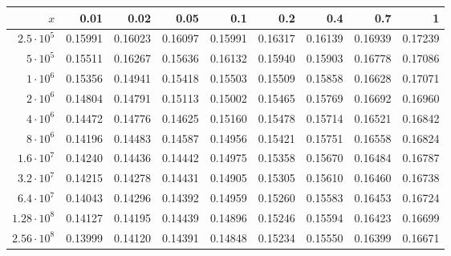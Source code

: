 \begin{tabular}{@{}rrrrrrrrr@{}}
\toprule
$x$ & 0.01 & 0.02 & 0.05 & 0.1 & 0.2 & 0.4 & 0.7 & 1 \\
\midrule
$2.5\cdot10^{5}$ & 0.15991 & 0.16023 & 0.16097 & 0.15991 & 0.16317 & 0.16139 & 0.16939 & 0.17239 \\
$5\cdot10^{5}$ & 0.15511 & 0.16267 & 0.15636 & 0.16132 & 0.15940 & 0.15903 & 0.16778 & 0.17086 \\
$1\cdot10^{6}$ & 0.15356 & 0.14941 & 0.15418 & 0.15503 & 0.15509 & 0.15858 & 0.16628 & 0.17071 \\
$2\cdot10^{6}$ & 0.14804 & 0.14791 & 0.15113 & 0.15002 & 0.15465 & 0.15769 & 0.16692 & 0.16960 \\
$4\cdot10^{6}$ & 0.14472 & 0.14776 & 0.14625 & 0.15160 & 0.15478 & 0.15714 & 0.16521 & 0.16842 \\
$8\cdot10^{6}$ & 0.14196 & 0.14483 & 0.14587 & 0.14956 & 0.15421 & 0.15751 & 0.16558 & 0.16824 \\
$1.6\cdot10^{7}$ & 0.14240 & 0.14436 & 0.14442 & 0.14975 & 0.15358 & 0.15670 & 0.16484 & 0.16787 \\
$3.2\cdot10^{7}$ & 0.14215 & 0.14278 & 0.14431 & 0.14905 & 0.15305 & 0.15610 & 0.16460 & 0.16738 \\
$6.4\cdot10^{7}$ & 0.14043 & 0.14296 & 0.14392 & 0.14959 & 0.15260 & 0.15583 & 0.16453 & 0.16724 \\
$1.28\cdot10^{8}$ & 0.14127 & 0.14195 & 0.14439 & 0.14896 & 0.15246 & 0.15594 & 0.16423 & 0.16699 \\
$2.56\cdot10^{8}$ & 0.13999 & 0.14120 & 0.14391 & 0.14848 & 0.15234 & 0.15550 & 0.16399 & 0.16671 \\
\bottomrule
\end{tabular}
